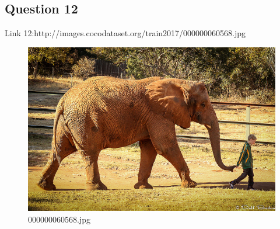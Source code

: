 \subsection*{Question 12}
Link 12:http://images.cocodataset.org/train2017/000000060568.jpg
    \begin{figure}[h]
        \centering
        \includegraphics[width=0.8\linewidth]{../image set/easy/000000060568.jpg}
        \caption{000000060568.jpg}
    \end{figure}
